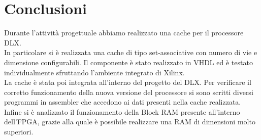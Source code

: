 \clearpage{\pagestyle{empty}\cleardoublepage}
\chapter*{Conclusioni}


Durante l'attivit\`a progettuale abbiamo realizzato una cache per il processore DLX.\\
In particolare si \`e realizzata una cache di tipo set-associative con numero di vie e dimensione configurabili. Il componente \`e stato realizzato in VHDL ed \`e testato individualmente sfruttando l'ambiente integrato di Xilinx.\\

La cache \`e stata poi integrata all'interno del progetto del DLX. Per verificare il corretto funzionamento della nuova versione del processore si sono scritti diversi programmi in assembler che accedono ai dati presenti nella cache realizzata.	\\

Infine si \`e analizzato il funzionamento della Block RAM presente all'interno dell'FPGA, grazie alla quale \`e possibile realizzare una RAM di dimensioni molto superiori.

